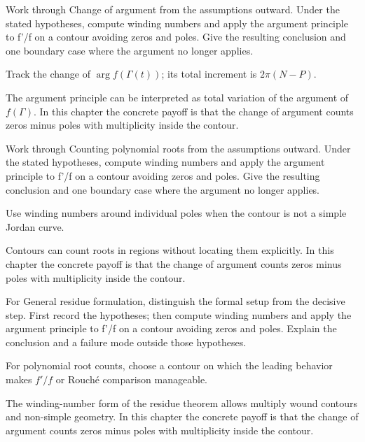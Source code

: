 \begin{exercise}\label{exr:iv12-06}
Work through Change of argument from the assumptions outward. Under the stated hypotheses, compute winding numbers and apply the argument principle to f'/f on a contour avoiding zeros and poles. Give the resulting conclusion and one boundary case where the argument no longer applies.
\end{exercise}
\begin{hint}
Track the change of \(\arg f(\Gamma(t))\); its total increment is \(2\pi(N-P)\).
\end{hint}
\begin{solution}
The argument principle can be interpreted as total variation of the argument of $f(\Gamma)$. In this chapter the concrete payoff is that the change of argument counts zeros minus poles with multiplicity inside the contour.
\end{solution}

\begin{exercise}\label{exr:iv12-07}
Work through Counting polynomial roots from the assumptions outward. Under the stated hypotheses, compute winding numbers and apply the argument principle to f'/f on a contour avoiding zeros and poles. Give the resulting conclusion and one boundary case where the argument no longer applies.
\end{exercise}
\begin{hint}
Use winding numbers around individual poles when the contour is not a simple Jordan curve.
\end{hint}
\begin{solution}
Contours can count roots in regions without locating them explicitly. In this chapter the concrete payoff is that the change of argument counts zeros minus poles with multiplicity inside the contour.
\end{solution}

\begin{exercise}\label{exr:iv12-08}
For General residue formulation, distinguish the formal setup from the decisive step. First record the hypotheses; then compute winding numbers and apply the argument principle to f'/f on a contour avoiding zeros and poles. Explain the conclusion and a failure mode outside those hypotheses.
\end{exercise}
\begin{hint}
For polynomial root counts, choose a contour on which the leading behavior makes \(f'/f\) or Rouché comparison manageable.
\end{hint}
\begin{solution}
The winding-number form of the residue theorem allows multiply wound contours and non-simple geometry. In this chapter the concrete payoff is that the change of argument counts zeros minus poles with multiplicity inside the contour.
\end{solution}

